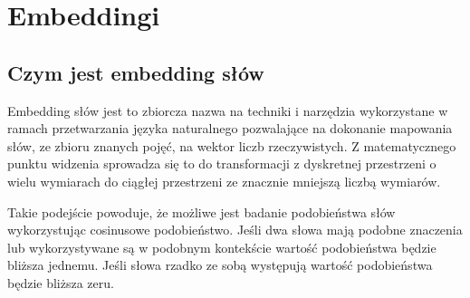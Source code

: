 \newpage %
\section{\label{embeddings}Embeddingi}

\subsection{Czym jest embedding słów}





Embedding słów jest to zbiorcza nazwa na techniki i narzędzia wykorzystane w ramach przetwarzania języka naturalnego pozwalające na dokonanie mapowania słów, ze zbioru znanych pojęć, na wektor liczb rzeczywistych. Z matematycznego punktu widzenia sprowadza się to do transformacji z dyskretnej przestrzeni o wielu wymiarach do ciągłej przestrzeni ze znacznie mniejszą liczbą wymiarów. \cite{Emb_def}



Takie podejście powoduje, że możliwe jest badanie podobieństwa słów wykorzystując cosinusowe podobieństwo. Jeśli dwa słowa mają podobne znaczenia lub wykorzystywane są w podobnym kontekście  wartość podobieństwa będzie bliższa jednemu. Jeśli słowa rzadko ze sobą występują wartość podobieństwa będzie bliższa zeru.  \cite{cooos_def}









